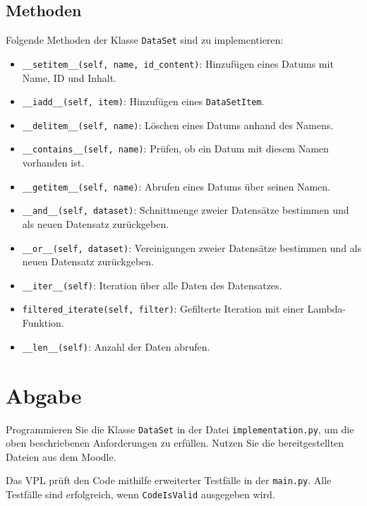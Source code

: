 \documentclass[a4paper,12pt]{article}
\begin{document}
\subsection{Methoden}

Folgende Methoden der Klasse \texttt{DataSet} sind zu implementieren:
\begin{itemize}
    \item \texttt{\_\_setitem\_\_(self, name, id\_content)}: Hinzufügen eines Datums mit Name, ID und Inhalt.
    \item \texttt{\_\_iadd\_\_(self, item)}: Hinzufügen eines \texttt{DataSetItem}.
    \item \texttt{\_\_delitem\_\_(self, name)}: Löschen eines Datums anhand des Namens.
    \item \texttt{\_\_contains\_\_(self, name)}: Prüfen, ob ein Datum mit diesem Namen vorhanden ist.
    \item \texttt{\_\_getitem\_\_(self, name)}: Abrufen eines Datums über seinen Namen.
    \item \texttt{\_\_and\_\_(self, dataset)}: Schnittmenge zweier Datensätze bestimmen und als neuen Datensatz zurückgeben.
    \item \texttt{\_\_or\_\_(self, dataset)}: Vereinigungen zweier Datensätze bestimmen und als neuen Datensatz zurückgeben.
    \item \texttt{\_\_iter\_\_(self)}: Iteration über alle Daten des Datensatzes.
    \item \texttt{filtered\_iterate(self, filter)}: Gefilterte Iteration mit einer Lambda-Funktion.
    \item \texttt{\_\_len\_\_(self)}: Anzahl der Daten abrufen.
\end{itemize}

\section{Abgabe}

Programmieren Sie die Klasse \texttt{DataSet} in der Datei \texttt{implementation.py}, um die oben beschriebenen Anforderungen zu erfüllen. Nutzen Sie die bereitgestellten Dateien aus dem Moodle.

Das VPL prüft den Code mithilfe erweiterter Testfälle in der \texttt{main.py}. Alle Testfälle sind erfolgreich, wenn \texttt{CodeIsValid} ausgegeben wird.
\end{document}
